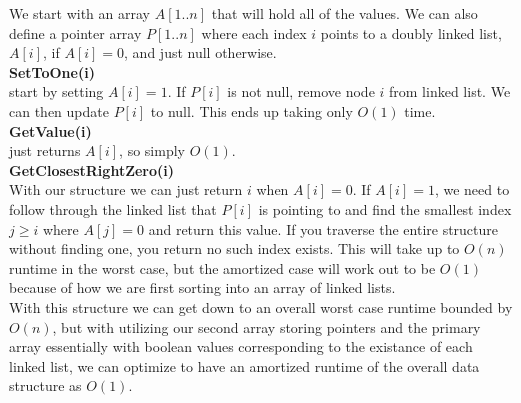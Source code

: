 \documentclass{article}
\begin{document}
\begin{enumerate}
We start with an array $A[1..n]$ that will hold all of the values. We can also define a pointer array $P[1..n]$ where each index $i$ points to a doubly linked list, $A[i]$, if $A[i] = 0$, and just null otherwise. \\
\newline 
\textbf{SetToOne(i)} \\
start by setting $A[i] = 1$. If $P[i]$ is not null, remove node $i$ from linked list. We can then update $P[i]$ to null. This ends up taking only $O(1)$ time. \\
\newline 
\textbf{GetValue(i)} \\
just returns $A[i]$, so simply $O(1)$. \\
\newline 
\textbf{GetClosestRightZero(i)} \\
With our structure we can just return $i$ when $A[i] = 0$. If $A[i] = 1$, we need to follow through the linked list that $P[i]$ is pointing to and find the smallest index $j \geq i$ where $A[j] = 0$ and return this value. If you traverse the entire structure without finding one, you return no such index exists. This will take up to $O(n)$ runtime in the worst case, but the amortized case will work out to be $O(1)$ because of how we are first sorting into an array of linked lists. \\
\newline 
With this structure we can get down to an overall worst case runtime bounded by $O(n)$, but with utilizing our second array storing pointers and the primary array essentially with boolean values corresponding to the existance of each linked list, we can optimize to have an amortized runtime of the overall data structure as $O(1)$.







\end{enumerate}
\end{document}
